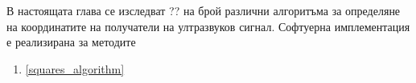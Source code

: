 В настоящата глава се изследват ?? на брой различни алгоритъма за определяне на координатите на получатели на ултразвуков сигнал. Софтуерна имплементация е реализирана за методите \begin{enumerate}
    \item \ref{squares_algorithm}
\end{enumerate}


